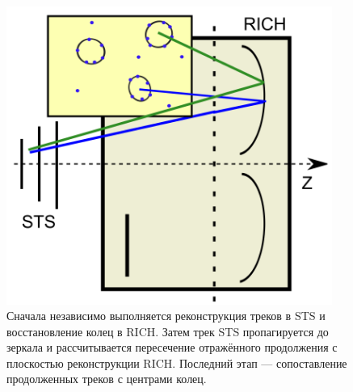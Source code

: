 \begin{minipage}[t]{0.495\textwidth}
\begin{figure}[H]
\centering
\includegraphics[width=0.95\textwidth]{pictures/STS_RICH_reco.png}
\caption{Сначала независимо выполняется реконструкция треков в STS и восстановление колец в RICH. Затем трек STS пропагируется до зеркала и рассчитывается пересечение отражённого продолжения с плоскостью реконструкции RICH. Последний этап --- сопоставление продолженных треков с центрами колец.}
\label{fig:StsRichReco}
\end{figure}
\end{minipage}
